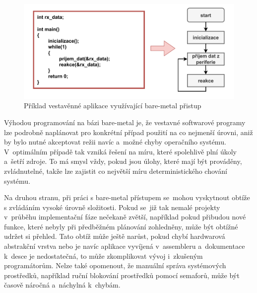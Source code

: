 \begin{figure}[h]
    \centering
    \includegraphics[width=1.00\textwidth]{obrazky-figures/bare_metal-1.pdf}
    
    \caption{Příklad vestavěnné aplikace využívající bare-metal přistup}
    \label{fig:bare-metal}
\end{figure}


Výhodou programování na bázi bare-metal je, že vestavné softwarové programy lze podrobně naplánovat pro konkrétní případ použití na co nejmenší úrovni, aniž by bylo nutné akceptovat režii navíc a~možné chyby operačního systému. V~optimálním případě tak vzniká řešení na míru, které spolehlivě plní úkoly a~šetří zdroje. To má smysl vždy, pokud jsou úlohy, které mají být prováděny, zvládnutelné, takže lze zajistit co největší míru deterministického chování systému.~\cite{sysgo_baremetal_vs_rtos}

Na druhou stranu, při práci s bare-metal přístupem se~mohou vyskytnout obtíže s zvládáním vysoké úrovně složitosti. Pokud se~již tak nemalé projekty v~průběhu implementační fáze nečekaně zvětší, například pokud přibudou nové funkce, které nebyly při předběžném plánování zohledněny, může být obtížné udržet si přehled. Tato obtíž může ještě narůst, pokud chybí hardwarová abstrakční vrstva nebo je navíc aplikace vyvíjená v~assembleru a~dokumentace k~desce je nedostatečná, to může zkomplikovat vývoj i~zkušeným programátorům. Nelze také opomenout, že manuální správa systémových prostředků, například ruční blokování prostředků pomocí semaforů, může být časově náročná a~náchylná k~chybám.~\cite{sysgo_baremetal_vs_rtos}

